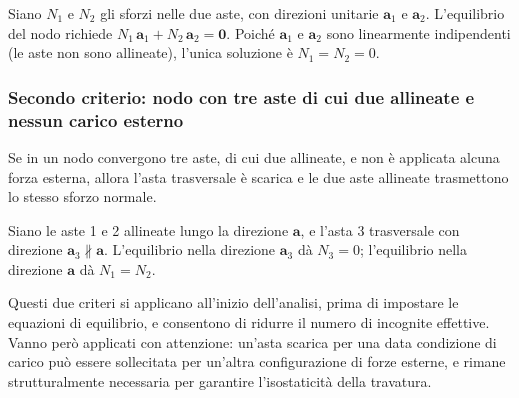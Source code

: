 


\begin{oss}
	Siano $N_1$ e $N_2$ gli sforzi nelle due aste,
	con direzioni unitarie $\mathbf{a}_1$ e $\mathbf{a}_2$.
	L'equilibrio del nodo richiede
	$N_1\,\mathbf{a}_1 + N_2\,\mathbf{a}_2 = \bm{0}$.
	Poiché $\mathbf{a}_1$ e $\mathbf{a}_2$ sono linearmente
	indipendenti (le aste non sono allineate),
	l'unica soluzione è $N_1 = N_2 = 0$.
\end{oss}


\subsubsection{Secondo criterio: nodo con tre aste di	cui due allineate e nessun carico esterno}
Se in un nodo convergono tre aste, di cui due
allineate, e non è applicata alcuna forza esterna,
allora l'asta trasversale è scarica e le due aste
allineate trasmettono lo stesso sforzo normale.

\begin{oss}
	Siano le aste 1 e 2 allineate lungo la direzione
	$\mathbf{a}$, e l'asta 3 trasversale con direzione
	$\mathbf{a}_3 \not\parallel \mathbf{a}$.
	L'equilibrio nella direzione $\mathbf{a}_3$ dà
	$N_3 = 0$; l'equilibrio nella direzione $\mathbf{a}$
	dà $N_1 = N_2$.
\end{oss}

Questi due criteri si applicano all'inizio
dell'analisi, prima di impostare le equazioni di
equilibrio, e consentono di ridurre il numero di
incognite effettive. Vanno però applicati con
attenzione: un'asta scarica per una data condizione
di carico può essere sollecitata per un'altra
configurazione di forze esterne, e rimane
strutturalmente necessaria per garantire
l'isostaticità della travatura.



